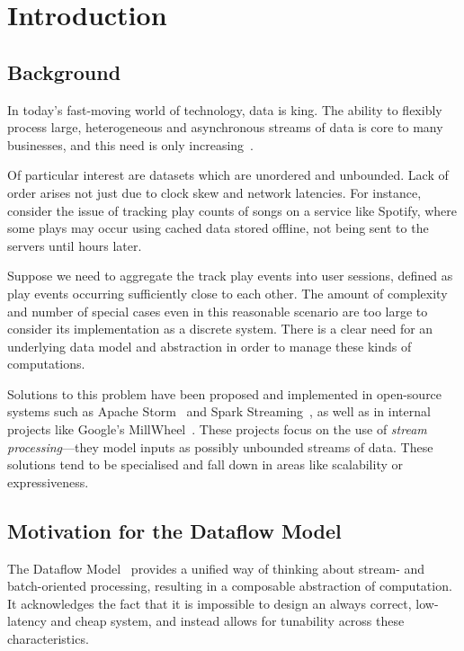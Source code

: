 \chapter{Introduction}\label{ch:intro}

\section{Background}\label{sec:intro:background}

In today's fast-moving world of technology, data is king.
The ability to flexibly process large, heterogeneous and asynchronous streams of data is core to many businesses, and this need is only increasing~\cite{Yin_2015}\cite{mit_bean_variety}.

Of particular interest are datasets which are unordered and unbounded.
Lack of order arises not just due to clock skew and network latencies.
For instance, consider the issue of tracking play counts of songs on a service like Spotify, where some plays may occur using cached data stored offline, not being sent to the servers until hours later.

Suppose we need to aggregate the track play events into user sessions, defined as play events occurring sufficiently close to each other.
The amount of complexity and number of special cases even in this reasonable scenario are too large to consider its implementation as a discrete system.
There is a clear need for an underlying data model and abstraction in order to manage these kinds of computations.

Solutions to this problem have been proposed and implemented in open-source systems such as Apache Storm~\cite{apache_storm} and Spark Streaming~\cite{spark:zaharia2013discretized}, as well as in internal projects like Google's MillWheel~\cite{akidau2013millwheel}.
These projects focus on the use of \emph{stream processing}---they model inputs as possibly unbounded streams of data.
These solutions tend to be specialised and fall down in areas like scalability or expressiveness.

\section{Motivation for the Dataflow Model}\label{sec:intro:motivation}

The Dataflow Model~\cite{Akidau:2015} provides a unified way of thinking about stream- and batch-oriented processing, resulting in a composable abstraction of computation.
It acknowledges the fact that it is impossible to design an always correct, low-latency and cheap system, and instead allows for tunability across these characteristics.

